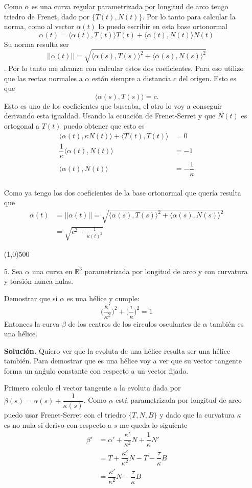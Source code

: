 \documentclass{article}
\begin{document}
\begin{itemize}
   Como $\alpha$ es una curva regular parametrizada por longitud de arco tengo triedro de Frenet, dado por $\{T(t),N(t)\}$. Por lo tanto para calcular la norma, como al vector $\alpha(t) $ lo puedo escribir en esta base ortonormal
   \[\alpha(t) = \langle \alpha(t),T(t) \rangle T(t) + \langle \alpha(t),N(t) \rangle N(t) \]
   Su norma resulta ser
   $$||\alpha(t)||=\sqrt{\langle \alpha(s),T(s) \rangle ^2 + \langle \alpha(s),N(s) \rangle ^2}$$.
   Por lo tanto me alcanza con calcular estos dos coeficientes. Para eso utilizo que las rectas normales a $\alpha$ están siempre a distancia $c$ del origen. Esto es que
   \[ \langle \alpha(s),T(s) \rangle  = c. \]
   Esto es uno de los coeficientes que buscaba, el otro lo voy a conseguir derivando esta igualdad. Usando la ecuación de Frenet-Serret y que $N(t)$ es ortogonal a $T(t)$ puedo obtener que esto es 
   \begin{align*}
   \langle \alpha(t),\kappa N(t) \rangle + \langle T(t),T(t) \rangle &= 0 \\
   \dfrac{1}{\kappa} \langle \alpha(t), N(t) \rangle &= -1 \\
    \langle \alpha(t), N(t) \rangle &= -\dfrac{1}{\kappa} \\
   \end{align*} 
   
   Como ya tengo los dos coeficientes de la base ortonormal que quería resulta que 
   \begin{align*}
   	\alpha(t) &= ||\alpha(t)||=\sqrt{\langle \alpha(s),T(s) \rangle ^2 + \langle \alpha(s),N(s) \rangle ^2} \\
   	&= \sqrt{c^2+\frac{1}{\kappa(t)^2}}
   \end{align*}
   
   \line(1,0){500}
   
   \item[5.] Sea $\alpha$ una curva en $\mathbb{R}^3$ parametrizada por longitud de arco y con curvatura y torsión nunca nulas.
   
   Demostrar que si $\alpha$ es una hélice y cumple: $$\bigg(\frac{\kappa'}{\kappa^2}\bigg)^2 + \bigg(\frac{\tau}{\kappa}\bigg)^2=1$$
   Entonces la curva $\beta$ de los centros de los circulos osculantes de $\alpha$ también es una hélice.
   
   \textbf{Solución.}
   Quiero ver que la evoluta de una hélice resulta ser una hélice también. Para demostrar que es una hélice voy a ver que su vector tangente forma un anǵulo constante con respecto a un vector fijado.
   
   Primero calculo el vector tangente a la evoluta dada por $\beta(s) = \alpha(s) + \dfrac{1}{\kappa(s)}$. Como $\alpha$ está parametrizada por longitud de arco puedo usar Frenet-Serret con el triedro $\{T,N,B\}$ y dado que la curvatura $\kappa$ es no nula si derivo con respecto a $s$ me queda lo siguiente
   \begin{align*}
   \beta' &= \alpha' + \dfrac{\kappa'}{\kappa^2}N + \dfrac{1}{\kappa}N' \\
   &= T + \dfrac{\kappa'}{\kappa^2}N - T - \dfrac{\tau}{\kappa}B \\
   &=  \dfrac{\kappa'}{\kappa^2}N - \dfrac{\tau}{\kappa}B
   \end{align*}
   

\end{itemize}
\end{document}
